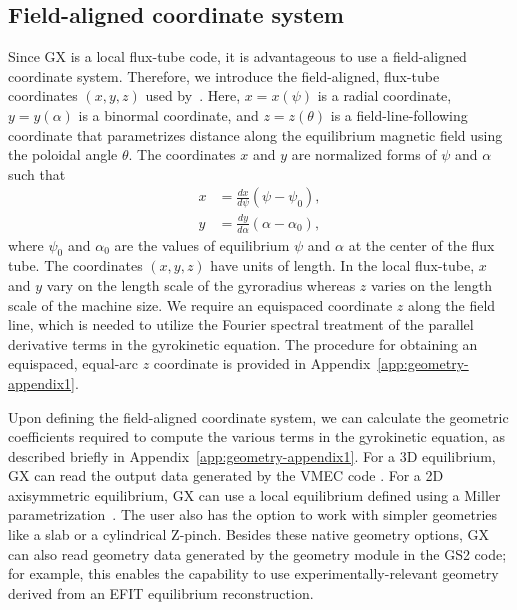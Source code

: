 \documentclass{jpp}
\newcommand{\GX}{{GX}\xspace}
\begin{document}
\subsection{Field-aligned coordinate system}
Since \GX is a local flux-tube code, it is advantageous to use a field-aligned coordinate system. Therefore, we introduce the field-aligned, flux-tube coordinates $(x, y, z)$ used by~\citet{Beer1995}. Here, $x = x(\psi)$ is a radial coordinate, $y= y(\alpha)$ is a binormal coordinate, and $z=z(\theta)$ is a field-line-following coordinate that parametrizes distance along the equilibrium magnetic field using the poloidal angle $\theta$. The coordinates $x$ and $y$ are normalized forms of $\psi$ and $\alpha$ such that
\begin{align}
    x &= \frac{dx}{d\psi}(\psi-\psi_0), \\
    y &= \frac{dy}{d\alpha}(\alpha-\alpha_0),
\end{align}
where $\psi_0$ and $\alpha_0$ are the values of equilibrium $\psi$ and $\alpha$ at the center of the flux tube. The coordinates $(x, y, z)$ have units of length. In the local flux-tube, $x$ and $y$ vary on the length scale of the gyroradius whereas $z$ varies on the length scale of the machine size. We require an equispaced coordinate $z$ along the field line, which is needed to utilize the Fourier spectral treatment of the parallel derivative terms in the gyrokinetic equation. The procedure for obtaining an equispaced, equal-arc $z$ coordinate is provided in Appendix~\ref{app:geometry-appendix1}. 

Upon defining the field-aligned coordinate system, we can calculate the geometric coefficients required {\color{black} to compute the various terms in the gyrokinetic equation}, as described briefly in Appendix~\ref{app:geometry-appendix1}. For a 3D equilibrium, \GX can read the output data generated by the VMEC code \citep{Hirshman1983}. For a 2D axisymmetric equilibrium, \GX can use a local equilibrium defined using a Miller parametrization~\citep{Miller1998}. The user also has the option to work with simpler geometries like a slab or a cylindrical Z-pinch. Besides these native geometry options, \GX can also read geometry data generated by the geometry module in the GS2 code; for example, this enables the capability to use experimentally-relevant geometry derived from an EFIT equilibrium reconstruction.


% 
\end{document}
